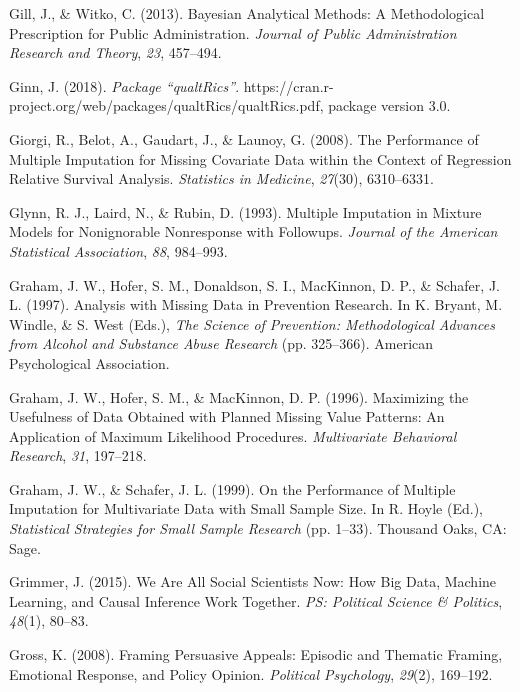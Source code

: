 \documentclass[12pt,econ]{sources/authesis}
\begin{document}
\leavevmode\hypertarget{ref-gill_2013_bayesian}{}%
Gill, J., \& Witko, C. (2013). Bayesian Analytical Methods: A Methodological Prescription for Public Administration. \emph{Journal of Public Administration Research and Theory}, \emph{23}, 457--494.

\leavevmode\hypertarget{ref-ginn_2018_package}{}%
Ginn, J. (2018). \emph{Package ``qualtRics''}. https://cran.r-project.org/web/packages/qualtRics/qualtRics.pdf, package version 3.0.

\leavevmode\hypertarget{ref-giorgi_2008_performance}{}%
Giorgi, R., Belot, A., Gaudart, J., \& Launoy, G. (2008). The Performance of Multiple Imputation for Missing Covariate Data within the Context of Regression Relative Survival Analysis. \emph{Statistics in Medicine}, \emph{27}(30), 6310--6331.

\leavevmode\hypertarget{ref-glynn_1993_multiple}{}%
Glynn, R. J., Laird, N., \& Rubin, D. (1993). Multiple Imputation in Mixture Models for Nonignorable Nonresponse with Followups. \emph{Journal of the American Statistical Association}, \emph{88}, 984--993.

\leavevmode\hypertarget{ref-graham_1997_analysis}{}%
Graham, J. W., Hofer, S. M., Donaldson, S. I., MacKinnon, D. P., \& Schafer, J. L. (1997). Analysis with Missing Data in Prevention Research. In K. Bryant, M. Windle, \& S. West (Eds.), \emph{The Science of Prevention: Methodological Advances from Alcohol and Substance Abuse Research} (pp. 325--366). American Psychological Association.

\leavevmode\hypertarget{ref-graham_1996_maximizing}{}%
Graham, J. W., Hofer, S. M., \& MacKinnon, D. P. (1996). Maximizing the Usefulness of Data Obtained with Planned Missing Value Patterns: An Application of Maximum Likelihood Procedures. \emph{Multivariate Behavioral Research}, \emph{31}, 197--218.

\leavevmode\hypertarget{ref-graham_1999_performance}{}%
Graham, J. W., \& Schafer, J. L. (1999). On the Performance of Multiple Imputation for Multivariate Data with Small Sample Size. In R. Hoyle (Ed.), \emph{Statistical Strategies for Small Sample Research} (pp. 1--33). Thousand Oaks, CA: Sage.

\leavevmode\hypertarget{ref-grimmer_2015_social}{}%
Grimmer, J. (2015). We Are All Social Scientists Now: How Big Data, Machine Learning, and Causal Inference Work Together. \emph{PS: Political Science \& Politics}, \emph{48}(1), 80--83.

\leavevmode\hypertarget{ref-gross_framing_2008}{}%
Gross, K. (2008). Framing Persuasive Appeals: Episodic and Thematic Framing, Emotional Response, and Policy Opinion. \emph{Political Psychology}, \emph{29}(2), 169--192.
\end{document}
